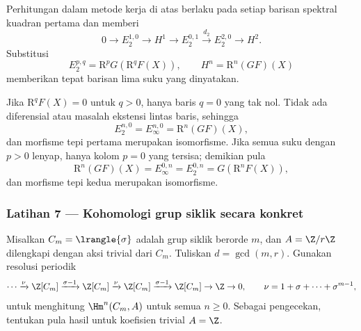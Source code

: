 Perhitungan dalam metode kerja di atas berlaku pada setiap barisan spektral
kuadran pertama dan memberi
\[
	0\to E_2^{1,0}\to H^1\to E_2^{0,1}
	\xrightarrow{d_2}E_2^{2,0}\to H^2.
\]
Substitusi
\[
	E_2^{p,q}=\mathrm{R}^pG(\mathrm{R}^qF(X)),
	\qquad H^n=\mathrm{R}^n(GF)(X)
\]
memberikan tepat barisan lima suku yang dinyatakan.

Jika $\mathrm{R}^qF(X)=0$ untuk $q>0$, hanya baris $q=0$ yang tak nol.
Tidak ada diferensial atau masalah ekstensi lintas baris, sehingga
\[
	E_2^{n,0}=E_\infty^{n,0}=\mathrm{R}^n(GF)(X),
\]
dan morfisme tepi pertama merupakan isomorfisme. Jika semua suku dengan $p>0$ lenyap,
hanya kolom $p=0$ yang tersisa; demikian pula
\[
	\mathrm{R}^n(GF)(X)=E_\infty^{0,n}=E_2^{0,n}
	=G(\mathrm{R}^nF(X)),
\]
dan morfisme tepi kedua merupakan isomorfisme.

\subsubsection*{Latihan 7 --- Kohomologi grup siklik secara konkret}
\hypertarget{o014.mastery.derived-spectral.002.ex07}{ }
\label{mastery:derived-spectral-002-ex07}

Misalkan $C_m=\lrangle{\sigma}$ adalah grup siklik berorde $m$, dan
$A=\Z/r\Z$ dilengkapi dengan aksi trivial dari $C_m$. Tuliskan $d=\gcd(m,r)$.
Gunakan resolusi periodik
\[
	\cdots\xrightarrow{\nu}\Z[C_m]
	\xrightarrow{\sigma-1}\Z[C_m]
	\xrightarrow{\nu}\Z[C_m]
	\xrightarrow{\sigma-1}\Z[C_m]\to\Z\to0,
	\qquad \nu=1+\sigma+\cdots+\sigma^{m-1},
\]
untuk menghitung $\Hm^n(C_m,A)$ untuk semua $n\geq0$. Sebagai pengecekan,
tentukan pula hasil untuk koefisien trivial $A=\Z$.

